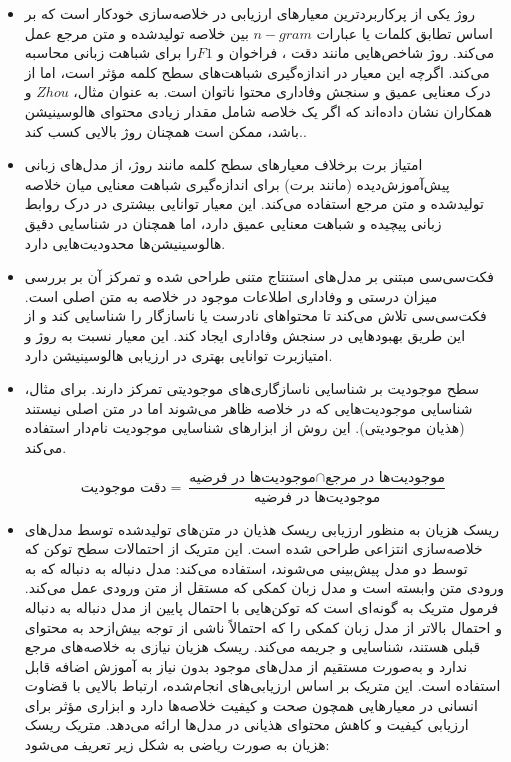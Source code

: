 \begin{itemize}
	\item روژ
	 یکی از پرکاربردترین معیارهای ارزیابی در خلاصه‌سازی خودکار است که بر اساس تطابق کلمات یا عبارات $n-gram$ بین خلاصه تولیدشده و متن مرجع عمل می‌کند. روژ شاخص‌هایی مانند دقت  ، فراخوان  و $F1 $را برای شباهت زبانی محاسبه می‌کند. اگرچه این معیار در اندازه‌گیری شباهت‌های سطح کلمه مؤثر است، اما از درک معنایی عمیق و سنجش وفاداری محتوا ناتوان است. به عنوان مثال، $Zhou$ و همکاران نشان داده‌اند که اگر یک خلاصه شامل مقدار زیادی محتوای هالوسینیشن باشد، ممکن است همچنان روژ بالایی کسب کند.\cite{zhou-etal-2021-detecting,lin-2004-rouge}.
	\item 
	امتیاز برت برخلاف معیارهای سطح کلمه مانند روژ، از مدل‌های زبانی پیش‌آموزش‌دیده (مانند برت) برای اندازه‌گیری شباهت معنایی میان خلاصه تولیدشده و متن مرجع استفاده می‌کند. این معیار توانایی بیشتری در درک روابط زبانی پیچیده و شباهت معنایی عمیق دارد، اما همچنان در شناسایی دقیق هالوسینیشن‌ها محدودیت‌هایی دارد\cite{zhang-etal-2024-benchmarking}.
	\item 
	فکت‌سی‌سی مبتنی بر مدل‌های استنتاج متنی طراحی شده و تمرکز آن بر بررسی میزان درستی و وفاداری اطلاعات موجود در خلاصه به متن اصلی است. فکت‌سی‌سی تلاش می‌کند تا محتواهای نادرست یا ناسازگار را شناسایی کند و از این طریق بهبودهایی در سنجش وفاداری ایجاد کند. این معیار نسبت به روژ و امتیازبرت توانایی بهتری در ارزیابی هالوسینیشن دارد\cite{factcc-etal-2020-evaluating}.
	
	\item 
	سطح موجودیت
	بر شناسایی ناسازگاری‌های موجودیتی تمرکز دارند. برای مثال، شناسایی موجودیت‌هایی که در خلاصه ظاهر می‌شوند اما در متن اصلی نیستند (هذیان موجودیتی). این روش از ابزارهای شناسایی موجودیت نام‌دار استفاده می‌کند\cite{nan_entity-level_2021}.

	\begin{equation}
		\text{دقت موجودیت} = \frac{\text{موجودیت‌ها در فرضیه} \cap \text{موجودیت‌ها در مرجع}}{\text{موجودیت‌ها در فرضیه}}
	\end{equation}
	
	
	
	\item {
	ریسک هزیان 
	به منظور ارزیابی ریسک هذیان در متن‌های تولیدشده توسط مدل‌های خلاصه‌سازی انتزاعی طراحی شده است. این متریک از احتمالات سطح توکن که توسط دو مدل پیش‌بینی می‌شوند، استفاده می‌کند: مدل دنباله به دنباله که به ورودی متن وابسته است و مدل زبان کمکی که مستقل از متن ورودی عمل می‌کند. فرمول متریک به گونه‌ای است که توکن‌هایی با احتمال پایین از مدل دنباله به دنباله و احتمال بالاتر از مدل زبان کمکی را که احتمالاً ناشی از توجه بیش‌ازحد به محتوای قبلی هستند، شناسایی و جریمه می‌کند. ریسک هزیان نیازی به خلاصه‌های مرجع ندارد و به‌صورت مستقیم از مدل‌های موجود بدون نیاز به آموزش اضافه قابل استفاده است. این متریک بر اساس ارزیابی‌های انجام‌شده، ارتباط بالایی با قضاوت انسانی در معیارهایی همچون صحت و کیفیت خلاصه‌ها دارد و ابزاری مؤثر برای ارزیابی کیفیت و کاهش محتوای هذیانی در مدل‌ها ارائه می‌دهد. 
	متریک ریسک هزیان به صورت ریاضی به شکل زیر تعریف می‌شود:
	

}
\end{itemize}
